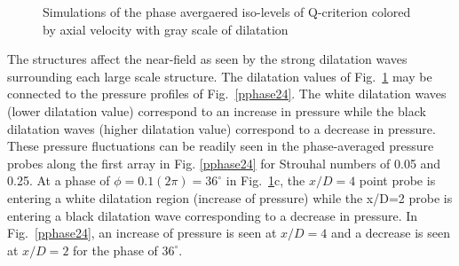 \documentclass[english]{aiaa-tc}
\begin{document}
\begin{figure}
\caption{Simulations of the phase avergaered iso-levels of Q-criterion colored by axial velocity with gray scale of dilatation}\label{isophase}
\end{figure}

The structures affect the near-field as seen by the strong dilatation
waves surrounding each large scale structure.  The dilatation values
of Fig.~\ref{isophase} may be connected to the pressure profiles of
Fig.~\ref{pphase24}.  The white dilatation waves (lower dilatation
value) correspond to an increase in pressure while the black
dilatation waves (higher dilatation value) correspond to a decrease in
pressure.  These pressure fluctuations can be readily seen in the
phase-averaged pressure probes along the first array in Fig.
\ref{pphase24} for Strouhal numbers of 0.05 and 0.25.  At a phase of
$\phi=0.1(2\pi)=36^\circ$ in Fig.~\ref{isophase}c, the $x/D=4$ point
probe is entering a white dilatation region (increase of pressure)
while the x/D=2 probe is entering a black dilatation wave
corresponding to a decrease in pressure. In Fig.~\ref{pphase24}, an
increase of pressure is seen at $x/D=4$ and a decrease is seen at
$x/D=2$ for the phase of $36^\circ$.
\end{document}
